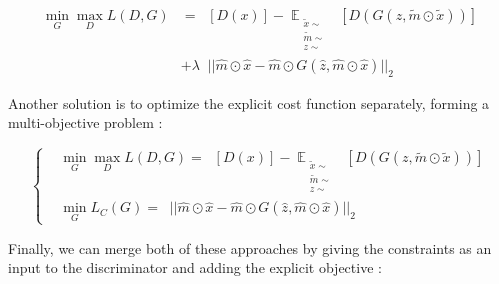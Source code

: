 \documentclass{article}
\begin{document}
		\begin{align}
			\min_G\max_D L(D, G)  &= \mathop{\mathbb{{E}}_{\substack{
						x \sim \mathop{\mathbb{{P}}_{r}} 
			}}} [D(x)] 
			- \mathop{\mathbb{{E}}}_{\substack{
					\tilde{x} \sim \mathop{\mathbb{{P}}_{r}} \\
					\tilde{m} \sim \mathop{\mathbb{{P}}_{m} }\\
					z \sim \mathop{\mathbb{{P}}_{z} }
			}} [D(G(z, \tilde{m}\odot\tilde{x}))]   \nonumber \\
		& + \lambda \mathop{\mathbb{{E}}_{\substack{
					\hat{x} \sim \mathop{\mathbb{{P}}_{r}} \\
					\hat{z} \sim \mathop{\mathbb{{P}}_{z}}\\
					\hat{m} \sim \mathop{\mathbb{{P}}_{z}} \\	
		}}} || \hat{m} \odot \hat{x} - \hat{m} \odot G(\hat{z}, \hat{m} \odot \hat{x}) ||_2
		\end{align}

		Another solution is to optimize the explicit cost function separately, forming a multi-objective problem : 

		\begin{equation}
		\left\{  \begin{split}
			& \min_G \max_D L(D, G)  = \mathop{\mathbb{{E}}_{\substack{
						x \sim \mathop{\mathbb{{P}}_{r}} \\
						m \sim \mathop{\mathbb{{P}}_{m}}
			}}} [D(x)] 
			- \mathop{\mathbb{{E}}}_{\substack{
					\tilde{x} \sim \mathop{\mathbb{{P}}_{r}} \\
					\tilde{m} \sim \mathop{\mathbb{{P}}_{m} }\\
					z \sim \mathop{\mathbb{{P}}_{z} }
			}} [D(G(z, \tilde{m}\odot\tilde{x}))] \\
			& \min_G L_C(G) = \mathop{\mathbb{{E}}_{\substack{
						\hat{x} \sim \mathop{\mathbb{{P}}_{r}} \\
						\hat{z} \sim \mathop{\mathbb{{P}}_{z}}\\
						\hat{m} \sim \mathop{\mathbb{{P}}_{z}} \\	
			}}} || \hat{m} \odot \hat{x} - \hat{m} \odot G(\hat{z}, \hat{m} \odot \hat{x}) ||_2
		 \end{split}\right.
		\end{equation}
		
		Finally, we can merge both of these approaches by giving the constraints as an input to the discriminator and adding the explicit objective :
		
\end{document}
